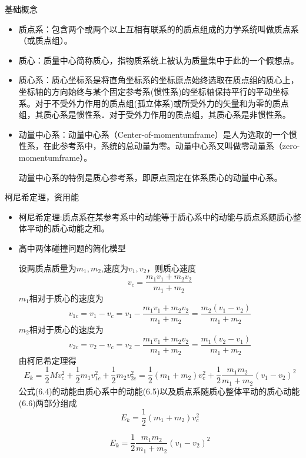 \begin{problemset}
	\item 基础概念
	\begin{itemize}
		\item 质点系：包含两个或两个以上互相有联系的的质点组成的力学系统叫做质点系（或质点组）。
		\item 质心：质量中心简称质心，指物质系统上被认为质量集中于此的一个假想点。
		\item 质心系：质心坐标系是将直角坐标系的坐标原点始终选取在质点组的质心上，坐标轴的方向始终与某个固定参考系(惯性系)的坐标轴保持平行的平动坐标系。对于不受外力作用的质点组(孤立体系)或所受外力的矢量和为零的质点组，其质心系是惯性系．对于受外力作用的质点组，其质心系是非惯性系。
		\item 动量中心系：动量中心系（Center-of-momentumframe）是人为选取的一个惯性系，在此参考系中，系统的总动量为零。动量中心系又叫做零动量系（zero-momentumframe）。
		
		动量中心系的特例是质心参考系，即原点固定在体系质心的动量中心系。
	\end{itemize}
	\item 柯尼希定理，资用能
	\begin{itemize}
		\item 柯尼希定理:质点系在某参考系中的动能等于质心系中的动能与质点系随质心整体平动的质心动能之和。
		\item 高中两体碰撞问题的简化模型
		
		设两质点质量为$m_1,m_2$,速度为$v_1,v_2$，则质心速度
		\begin{equation}
			v_c=\dfrac{m_{1} v_{1}+m_{2} v_{2}}{m_{1}+m_{2}}
		\end{equation}
		$m_1$相对于质心的速度为
		\begin{equation}
			v_{1c}=v_1-v_c=v_1-\dfrac{m_{1} v_{1}+m_{2} v_{2}}{m_{1}+m_{2}}=\dfrac{m_2(v_1-v_2)}{m_1+m_2}
		\end{equation}
		$m_2$相对于质心的速度为
		\begin{equation}
			v_{2c}=v_2-v_c=v_2-\dfrac{m_{1} v_{1}+m_{2} v_{2}}{m_{1}+m_{2}}=\dfrac{m_1(v_2-v_1)}{m_1+m_2}
		\end{equation}
		由柯尼希定理得
		\begin{equation}
			E_k=\dfrac{1}{2}Mv_c^2+\dfrac{1}{2}m_1v_{1c}^2+\dfrac{1}{2}m_2v_{2c}^2=\dfrac{1}{2}(m_1+m_2)v_c^2+\dfrac{1}{2}\dfrac{m_1m_2}{m_1+m_2}(v_1-v_2)^2
		\end{equation}
		公式(6.4)的动能由质心系中的动能(6.5)以及质点系随质心整体平动的质心动能(6.6)两部分组成
		\begin{equation}
			E_k=\dfrac{1}{2}(m_1+m_2)v_c^2
		\end{equation}
		
		\begin{equation}
			E_k=\dfrac{1}{2}\dfrac{m_1m_2}{m_1+m_2}(v_1-v_2)^2
		\end{equation}
		
	\end{itemize}
\end{problemset}
